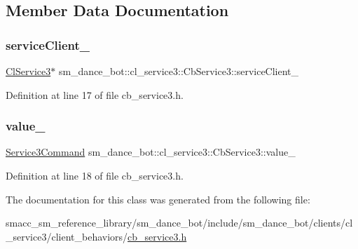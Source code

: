 \subsection{Member Data Documentation}
\mbox{\label{classsm__dance__bot_1_1cl__service3_1_1CbService3_aad53b5aa5eb595c5add3701cfe72079c}} 
\subsubsection{\texorpdfstring{service\+Client\+\_\+}{serviceClient\_}}
{\footnotesize\ttfamily \hyperlink{classsm__dance__bot_1_1cl__service3_1_1ClService3}{Cl\+Service3}$\ast$ sm\+\_\+dance\+\_\+bot\+::cl\+\_\+service3\+::\+Cb\+Service3\+::service\+Client\+\_\+\hspace{0.3cm}{\ttfamily [private]}}



Definition at line 17 of file cb\+\_\+service3.\+h.

\mbox{\label{classsm__dance__bot_1_1cl__service3_1_1CbService3_a9df8640d9bc42607256ca76df60a5af0}} 
\subsubsection{\texorpdfstring{value\+\_\+}{value\_}}
{\footnotesize\ttfamily \hyperlink{namespacesm__dance__bot_1_1cl__service3_adbcecb84d61edff09f1fb67ef9607ac4}{Service3\+Command} sm\+\_\+dance\+\_\+bot\+::cl\+\_\+service3\+::\+Cb\+Service3\+::value\+\_\+\hspace{0.3cm}{\ttfamily [private]}}



Definition at line 18 of file cb\+\_\+service3.\+h.



The documentation for this class was generated from the following file\+:\begin{DoxyCompactItemize}
\item 
smacc\+\_\+sm\+\_\+reference\+\_\+library/sm\+\_\+dance\+\_\+bot/include/sm\+\_\+dance\+\_\+bot/clients/cl\+\_\+service3/client\+\_\+behaviors/\hyperlink{include_2sm__dance__bot_2clients_2cl__service3_2client__behaviors_2cb__service3_8h}{cb\+\_\+service3.\+h}\end{DoxyCompactItemize}
